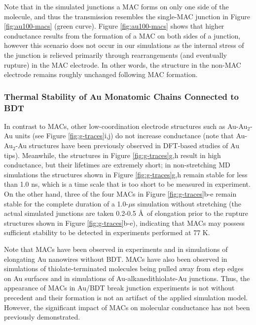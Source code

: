 \documentclass[10pt]{report}  %
\newcommand\findent{\hspace*{\parindent}}
\begin{document}
Note that in the simulated junctions a MAC forms on only one side of the molecule, and thus the transmission resembles the single-MAC junction in Figure \ref{fig:au100-macs} (green curve). Figure \ref{fig:au100-macs} shows that higher conductance results from the formation of a MAC on both sides of a junction, however this scenario does not occur in our simulations as the internal stress of the junction is relieved primarily through rearrangements (and eventually rupture) in the MAC electrode. In other words, the structure in the non-MAC electrode remains roughly unchanged following MAC formation.

\subsubsection{Thermal Stability of Au Monatomic Chains Connected to BDT}

\findent In contrast to MACs, other low-coordination electrode structures such as Au-Au$_2$-Au units (see Figure \ref{fig:g-traces}i,j) do not increase conductance (note that Au-Au$_2$-Au structures have been previously observed in DFT-based studies of Au tips\cite{Li:2007,Tavazza:2010}). Meanwhile, the structures in Figure \ref{fig:g-traces}g,h result in high conductance, but their lifetimes are extremely short; in non-stretching MD simulations the structures shown in Figure \ref{fig:g-traces}g,h remain stable for less than 1.0 ns, which is a time scale that is too short to be measured in experiment. On the other hand, three of the four MACs in Figure \ref{fig:g-traces}b-e remain stable for the complete duration of a 1.0-$\mu$s simulation without stretching (the actual simulated junctions are taken 0.2-0.5 \AA\ of elongation prior to the rupture structures shown in Figure \ref{fig:g-traces}b-e), indicating that MACs may possess sufficient stability to be detected in experiments performed at 77 K.

Note that MACs have been observed in experiments \cite{Coura:2004, Yanson:1998, Ohnishi:1998} and in simulations \cite{Pu:2008,Coura:2004,Tavazza:2010} of elongating Au nanowires without BDT. MACs have also been observed in simulations of thiolate-terminated molecules being pulled away from step edges on Au surfaces \cite{Kruger:2002} and in simulations of Au-alkanedithiolate-Au junctions.\cite{Paulsson:2009} Thus, the appearance of MACs in Au/BDT break junction experiments is not without precedent and their formation is not an artifact of the applied simulation model. However, the significant impact of MACs on molecular conductance has not been previously demonstrated.
\end{document}
